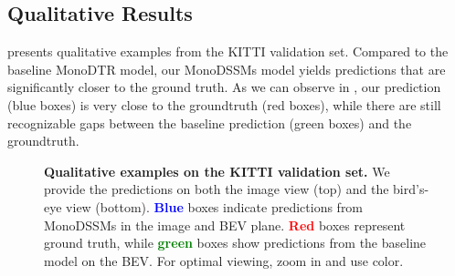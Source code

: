 \subsection{Qualitative Results}
 presents qualitative examples from the KITTI validation set. Compared to the baseline MonoDTR model, our MonoDSSMs model yields predictions that are significantly closer to the ground truth. As we can observe in , our prediction (blue boxes) is very close to the groundtruth (red boxes), while there are still recognizable gaps between the baseline prediction (green boxes) and the groundtruth.
\begin{figure}[t!]
    \centering
    
    \caption{\textbf{Qualitative examples on the KITTI validation set.} We provide the predictions on both the image view (top) and the bird's-eye view (bottom). \textbf{\textcolor{blue}{Blue}} boxes indicate predictions from MonoDSSMs in the image and BEV plane. \textbf{\textcolor{red}{Red}} boxes represent ground truth, while \textbf{\textcolor{green}{green}} boxes show predictions from the baseline model on the BEV. For optimal viewing, zoom in and use color.}
    \label{monodssms:fig:qualitative}
\end{figure}